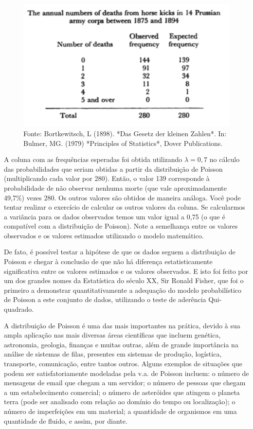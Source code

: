 \documentclass[
]{book}
\theoremstyle{definition}
\theoremstyle{definition}
\theoremstyle{definition}
\theoremstyle{remark}
\begin{document}
\begin{figure}
\includegraphics[width=0.7\linewidth]{img/prussian-cavalry-horse-kick-table} \caption{Fonte: Bortkewitsch, L (1898). *Das Gesetz der kleinen Zahlen*. In: Bulmer, MG. (1979) *Principles of Statistics*, Dover Publications.}\label{fig:ch7-prussian-cavalry-horse-kick-table}
\end{figure}

A coluna com as frequências esperadas foi obtida utilizando \(\lambda = 0,7\) no cálculo das probabilidades que seriam obtidas a partir da distribuição de Poisson (multiplicando cada valor por 280). Então, o valor 139 corresponde à probabilidade de não observar nenhuma morte (que vale aproximadamente 49,7\%) vezes 280. Os outros valores são obtidos de maneira análoga. Você pode tentar realizar o exercício de calcular os outros valores da coluna. Se calcularmos a variância para os dados observados temos um valor igual a 0,75 (o que é compatível com a distribuição de Poisson). Note a semelhança entre os valores observados e os valores estimados utilizando o modelo matemático.

De fato, é possível testar a hipótese de que os dados seguem a distribuição de Poisson e chegar à conclusão de que não há diferença estatisticamente significativa entre os valores estimados e os valores observados. E isto foi feito por um dos grandes nomes da Estatística do século XX, Sir Ronald Fisher, que foi o primeiro a demonstrar quantitativamente a adequação do modelo probabilístico de Poisson a este conjunto de dados, utilizando o teste de aderência Qui-quadrado.

A distribuição de Poisson é uma das mais importantes na prática, devido à sua ampla aplicação nas mais diversas áreas científicas que incluem genética, astronomia, geologia, finanças e muitas outras, além de grande importância na análise de sistemas de filas, presentes em sistemas de produção, logística, transporte, comunicação, entre tantos outros. Alguns exemplos de situações que podem ser satisfatoriamente modeladas pela v.a. de Poisson incluem: o número de mensagens de email que chegam a um servidor; o número de pessoas que chegam a um estabelecimento comercial; o número de asteróides que atingem o planeta terra (pode ser analisado com relação ao domínio do tempo ou localização); o número de imperfeições em um material; a quantidade de organismos em uma quantidade de fluido, e assim, por diante.
\end{document}
